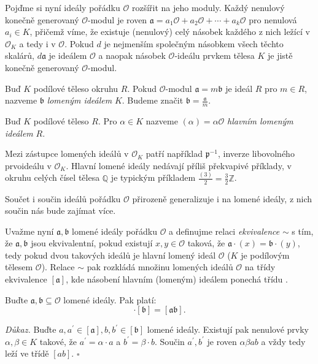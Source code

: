 \documentclass[12pt]{report}
\begin{document}
Pojďme si nyní ideály pořádku $\mathcal{O}$ rozšířit na jeho moduly. Každý nenulový konečně generovaný $\mathcal{O}$-modul je roven $\mathfrak{a} =  a_1 \mathcal{O} + a_2 \mathcal{O} + \cdots + a_k \mathcal{O}$ pro nenulová $a_i \in K$, přičemž víme, že existuje (nenulový) celý násobek každého z nich ležící v $\mathcal{O}_K$ a tedy i v $\mathcal{O}$. Pokud $d$ je nejmenším společným násobkem všech těchto skalárů, $d \mathfrak{a}$ je ideálem $\mathcal{O}$ a naopak násobek $\mathcal{O}$-ideálu prvkem tělesa $K$ je jistě konečně generovaný $\mathcal{O}$-modul.

\begin{definice}
Buď $K$ podílové těleso okruhu $R$. Pokud $\mathcal{O}$-modul $\mathfrak{a} =  m \mathfrak{b}$ je ideál $R$ pro $m \in R$, nazveme $\mathfrak{b}$ \textit{lomeným ideálem} $K$. Budeme značit $\mathfrak{b} = \frac{\mathfrak{a}}{m}$.
\end{definice}

\begin{definice}
Buď $K$ podílové těleso $R$. Pro $\alpha \in K$ nazveme $(\alpha) = \alpha \mathcal{O}$ \textit{hlavním lomeným ideálem} $R$.
\end{definice}

Mezi zástupce lomených ideálů v $\mathcal{O}_K$ patří například $\mathfrak{p}^{-1}$, inverze libovolného prvoideálu v $\mathcal{O}_K$. Hlavní lomené ideály nedávají příliš překvapivé příklady, v okruhu celých čísel tělesa $\mathbb{Q}$ je typickým příkladem $\frac{(3)}{2} = \frac{3}{2} \mathbb{Z}$.

Součet i součin ideálů pořádku $\mathcal{O}$ přirozeně generalizuje i na lomené ideály, z nich součin nás bude zajímat více.

Uvažme nyní $\mathfrak{a},\mathfrak{b}$ lomené ideály pořádku $\mathcal{O}$ a definujme relaci \textit{ekvivalence} $\sim$ s tím, že $\mathfrak{a},\mathfrak{b}$ jsou ekvivalentní, pokud existují $x,y \in \mathcal{O}$ taková, že $\mathfrak{a} \cdot (x) = \mathfrak{b} \cdot (y)$, tedy pokud  dvou takových ideálů je hlavní lomený ideál $\mathcal{O}$ ($K$ je podílovým tělesem $\mathcal{O}$). Relace $\sim$ pak rozkládá množinu lomených ideálů $\mathcal{O}$ na třídy ekvivalence $[\mathfrak{a}]$, kde násobení hlavním (lomeným) ideálem ponechá třídu .

\begin{veta}
Buďte $\mathfrak{a},\mathfrak{b} \subseteq \mathcal{O}$ lomené ideály. Pak platí:
\begin{equation*}
[\mathfrak{a}] \cdot [\mathfrak{b}] = [\mathfrak{ab}].
\end{equation*}
\end{veta}
\noindent \textit{Důkaz.} Buďte $a,a^\prime \in [\mathfrak{a}], b, b^\prime \in [\mathfrak{b}]$ lomené ideály. Existují pak nenulové prvky $\alpha,\beta \in K$ takové, že $a^\prime = \alpha \cdot a$ a $b^\prime = \beta \cdot b$. Součin $a^\prime,b^\prime$ je roven $\alpha \beta a b$ a vždy tedy leží ve třídě $[ab]$. \hfill $\square$\\
\end{document}
